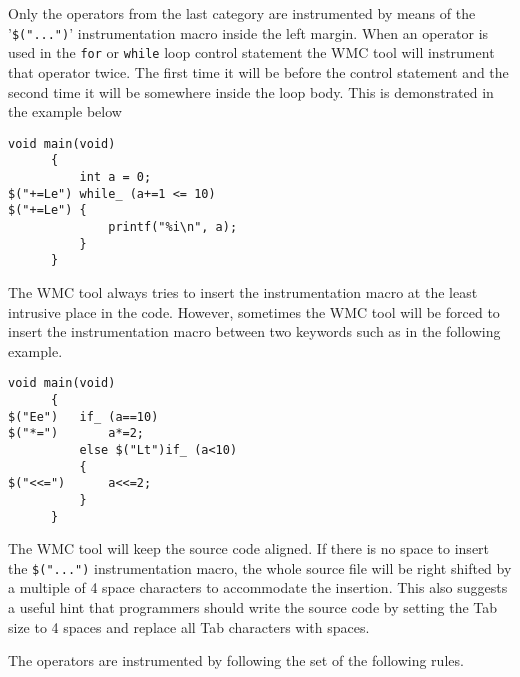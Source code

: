 Only the operators from the last category are instrumented by means of the '\verb|$("...")|' instrumentation macro inside the left margin. When an operator is used in the \verb|for| or \verb|while| loop control statement the WMC tool will instrument that operator twice. The first time it will be before the control statement and the second time it will be somewhere inside the loop body. This is demonstrated in the example below

\begin{Verbatim}[fontsize=\small]
      void main(void)
      {
          int a = 0;
$("+=Le") while_ (a+=1 <= 10)
$("+=Le") {
              printf("%i\n", a);
          }
      }
\end{Verbatim}

The WMC tool always tries to insert the instrumentation macro at the least intrusive place in the code. However, sometimes the WMC tool will be forced to insert the instrumentation macro between two keywords such as in the following example.

\begin{Verbatim}[fontsize=\small]
      void main(void)
      {
$("Ee")   if_ (a==10)
$("*=")       a*=2;
          else $("Lt")if_ (a<10)
          {
$("<<=")      a<<=2;
          }
      }
\end{Verbatim}

The WMC tool will keep the source code aligned. If there is no space to insert the \verb|$("...")| instrumentation macro, the whole source file will be right shifted by a multiple of 4 space characters to accommodate the insertion. This also suggests a useful hint that programmers should write the source code by setting the Tab size to 4 spaces and replace all Tab characters with spaces.

The operators are instrumented by following the set of the following rules.

